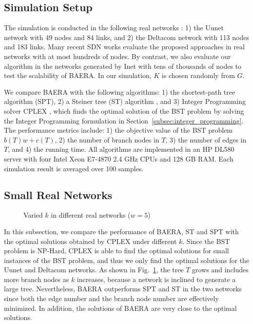 \documentclass[conference]{IEEEtran}
\begin{document}
\subsection{Simulation Setup}

The simulation is conducted in the following real networks \cite{Zoowebsite}: 1) the Uunet network with 49 nodes and 84 links, and
2) the Deltacom network with 113 nodes and 183 links. Many recent SDN works
\cite{Agarwal2013, Qazi2013} evaluate the proposed approaches in real
networks with at most hundreds of nodes. By contrast, we also evaluate our
algorithm in the networks generated by Inet \cite{Tangmunarunkit2002,
Inetwebsite} with tens of thousands of nodes to test the scalability of
BAERA. In our simulation, $K$ is chosen randomly from $G$.

We compare BAERA with the following algorithms: 1) the shortest-path tree
algorithm (SPT), 2) a Steiner tree (ST) algorithm \cite{Takahashi1980}, and 3)
Integer Programming solver CPLEX \cite{cplexwebsite}, which finds the
optimal solution of the BST problem by solving the Integer Programming
formulation in Section~\ref{subsec:integer_programming}. The performance
metrics include: 1) the objective value of the BST problem $b(T)w+c(T)$, 2)
the number of branch nodes in $T$, 3) the number of edges in $T$, and 4) the
running time. All algorithms are implemented in an HP DL580 server with four
Intel Xeon E7-4870 2.4 GHz CPUs and 128 GB RAM. Each simulation result is
averaged over 100 samples.

\subsection{Small Real Networks}

\begin{figure}[t]
 
\caption{Varied $k$ in different real networks ($w=5$)}
\label{fig:comparing_with_cplex}
\end{figure}

In this subsection, we compare the performance of BAERA, ST and SPT with the
optimal solutions obtained by CPLEX under different $k$. Since the BST
problem is NP-Hard, CPLEX is able to find the optimal solutions for small
instances of the BST problem, and thus we only find the optimal solutions
for the Uunet and Deltacom networks. As shown in Fig.~\ref {fig:comparing_with_cplex}, the tree $T$ grows and includes more branch
nodes as $k$ increases, because a network is inclined to generate a large
tree. Nevertheless, BAERA outperforms SPT and ST in the two networks since
both the edge number and the branch node number are effectively minimized.
 In addition, the solutions of BAERA are very close to the optimal solutions.
\end{document}
